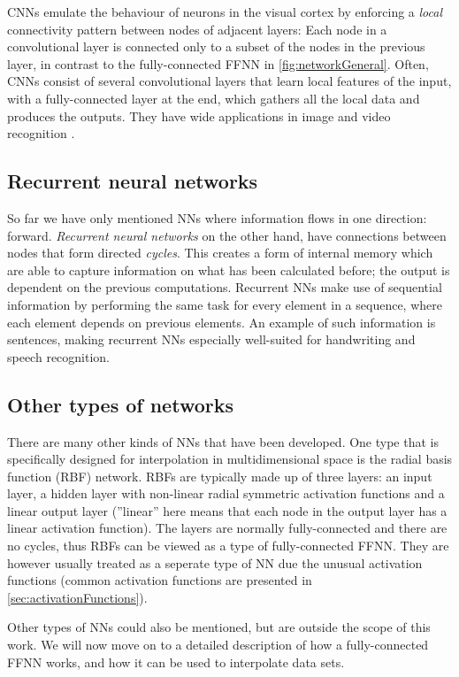 \documentclass[twoside,english]{uiofysmaster}
\begin{document}
CNNs emulate the behaviour of neurons in the visual cortex by enforcing a \textit{local} connectivity pattern
between nodes of adjacent layers: Each node
in a convolutional layer is connected only to a subset of the nodes in the previous layer, 
in contrast to the fully-connected FFNN in \autoref{fig:networkGeneral}.
Often, CNNs 
consist of several convolutional layers that learn local features of the input, with a fully-connected layer at the end, 
which gathers all the local data and produces the outputs. They have wide applications in image and video recognition
\cite{LeCun15}. 

\subsection{Recurrent neural networks}
So far we have only mentioned NNs where information flows in one direction: forward. \textit{Recurrent neural networks} on
the other hand, have connections between nodes that form directed \textit{cycles}. This creates a form of 
internal memory which are able to capture information on what has been calculated before; the output is dependent 
on the previous computations. Recurrent NNs make use of sequential information by performing the same task for 
every element in a sequence, where each element depends on previous elements. An example of such information is 
sentences, making recurrent NNs especially well-suited for handwriting and speech recognition.

\subsection{Other types of networks}
There are many other kinds of NNs that have been developed. One type that is specifically designed for interpolation
in multidimensional space is the radial basis function (RBF) network. RBFs are typically made up of three layers: 
an input layer, a hidden layer with non-linear radial symmetric activation functions and a linear output layer (''linear'' here
means that each node in the output layer has a linear activation function). The layers are normally fully-connected and 
there are no cycles, thus RBFs can be viewed as a type of fully-connected FFNN. They are however usually treated as
a seperate type of NN due the unusual activation functions (common activation functions are presented in
\autoref{sec:activationFunctions}).

Other types of NNs could also be mentioned, but are outside the scope of this work. We will now move on to a detailed description
of how a fully-connected FFNN works, and how it can be used to interpolate data sets. 
\end{document}
